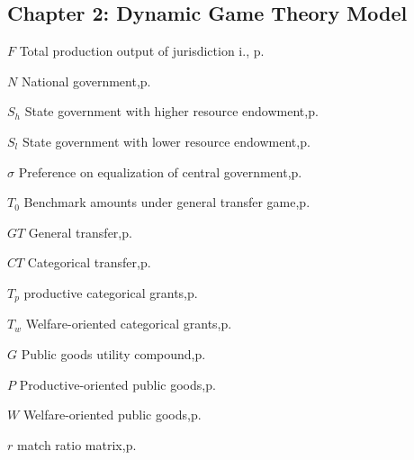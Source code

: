 \begin{eqlist}
    \section*{ Chapter 2: Dynamic Game Theory Model}
    \item[$F$]
    Total production output of jurisdiction i., \hfill p.~\pageref{F}

    \item[$N$]
    National government,\hfill p.~\pageref{player}

    \item[$S_h$]
    State government with higher resource endowment,\hfill p.~\pageref{player}

    \item[$S_l$]
    State government with lower resource endowment,\hfill p.~\pageref{player}

    \item[$\sigma$]
    Preference on equalization of central government,\hfill p.~\pageref{player}

    \item[$T_0$]
    Benchmark amounts under general transfer game,\hfill p.~\pageref{generaltransfer}

    \item[$GT$]
    General transfer,\hfill p.~\pageref{transfer}

    \item[$CT$]
    Categorical transfer,\hfill p.~\pageref{transfer}

    \item[$T_{p}$]
    productive categorical grants,\hfill p.~\pageref{mrmatrix}

    \item[$T_{w}$]
    Welfare-oriented categorical grants,\hfill p.~\pageref{mrmatrix}

    \item[$G$]
    Public goods utility compound,\hfill p.~\pageref{pgmatrix}

    \item[$P$]
    Productive-oriented public goods,\hfill p.~\pageref{pgmatrix}

    \item[$W$]
    Welfare-oriented public goods,\hfill p.~\pageref{pgmatrix}

    \item[$r$]
    match ratio matrix,\hfill p.~\pageref{mrmatrix}


\end{eqlist}
